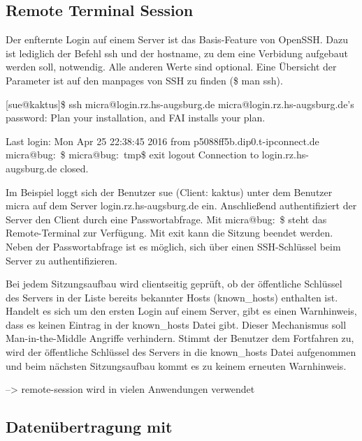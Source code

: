 \documentclass[ngerman,pdf]{wkcms}    %
\begin{document}
\subsection{Remote Terminal Session}

Der enfternte Login auf einem Server ist das Basis-Feature von OpenSSH.
Dazu ist lediglich der Befehl \IT ssh und der \IT hostname, zu dem eine Verbidung aufgebaut werden soll, notwendig. Alle anderen Werte sind optional.
Eine Übersicht der Parameter ist auf den manpages von SSH zu finden
(\$ man ssh).

\begin{program}

[sue@kaktus]\$ ssh micra@login.rz.hs-augsburg.de
micra@login.rz.hs-augsburg.de's password:
Plan your installation, and FAI installs your plan.

Last login: Mon Apr 25 22:38:45 2016
from p5088ff5b.dip0.t-ipconnect.de
micra@bug:~\$
micra@bug:~\/tmp\$ exit
logout
Connection to login.rz.hs-augsburg.de closed.

\end{program}

Im Beispiel loggt sich der Benutzer \IT sue (Client: \IT kaktus) unter dem Benutzer \IT micra auf dem Server \IT login.rz.hs-augsburg.de ein. Anschließend authentifiziert der Server den Client durch eine Passwortabfrage. Mit \IT micra@bug:~\$ steht das Remote-Terminal zur Verfügung. Mit \IT exit kann die Sitzung beendet werden. Neben der Passwortabfrage ist es möglich, sich über einen SSH-Schlüssel beim Server zu authentifizieren.

Bei jedem Sitzungsaufbau wird clientseitig geprüft, ob der öffentliche Schlüssel des Servers in der Liste bereits bekannter Hosts (\IT known\_hosts) enthalten ist. Handelt es sich um den ersten Login auf einem Server, gibt es einen Warnhinweis, dass es keinen Eintrag in der known\_hosts Datei gibt. Dieser Mechanismus soll Man-in-the-Middle Angriffe verhindern. Stimmt der Benutzer dem Fortfahren zu, wird der öffentliche Schlüssel des Servers in die \IT known\_hosts Datei aufgenommen und beim nächsten Sitzungsaufbau kommt es zu keinem erneuten Warnhinweis. \cite[S. 25]{SSH}

--> remote-session wird in vielen Anwendungen verwendet

\subsection{Datenübertragung mit }
\end{document}

